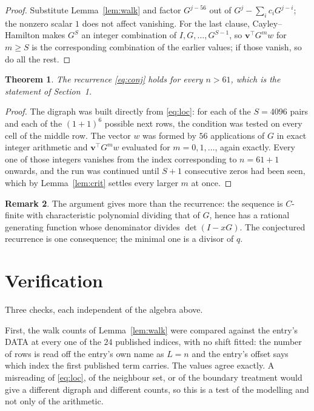 \documentclass[11pt,a4paper]{article}
\theoremstyle{plain}
\newtheorem{theorem}{Theorem}
\theoremstyle{definition}
\newtheorem{remark}[theorem]{Remark}
\begin{document}
\begin{proof}
Substitute Lemma~\ref{lem:walk} and factor $G^{j-56}$ out of
$G^{j}-\sum_ic_iG^{j-i}$; the nonzero scalar $1$ does not affect
vanishing. For the last clause, Cayley--Hamilton makes $G^{S}$ an integer combination of
$I,G,\dots,G^{S-1}$, so $\mathbf{v}^{\!\top}G^{m}w$ for $m\ge S$ is the corresponding
combination of the earlier values; if those vanish, so do all the rest.
\end{proof}

\begin{theorem}
The recurrence \eqref{eq:conj} holds for every $n>61$, which is the statement of
Section~1.
\end{theorem}

\begin{proof}
The digraph was built directly from \eqref{eq:loc}: for each of the $S=4096$ pairs and each
of the $(1+1)^{6}$ possible next rows, the condition was tested on every cell of
the middle row. The vector $w$ was formed by $56$ applications of $G$ in exact integer
arithmetic and $\mathbf{v}^{\!\top}G^{m}w$ evaluated for $m=0,1,\dots$, again exactly.
Every one of those integers vanishes from the index corresponding to $n=61+1$ onwards,
and the run was continued until $S+1$ consecutive zeros had been seen, which by
Lemma~\ref{lem:crit} settles every larger $m$ at once.
\end{proof}

\begin{remark}
The argument gives more than the recurrence: the sequence is $C$-finite with characteristic
polynomial dividing that of $G$, hence has a rational generating function whose denominator
divides $\det(I-xG)$. The conjectured recurrence is one consequence; the minimal one is a
divisor of $q$.
\end{remark}

\section{Verification}

Three checks, each independent of the algebra above.

First, the walk counts of Lemma~\ref{lem:walk} were compared against the entry's DATA at
every one of the $24$ published indices, with no shift fitted: the number of rows is
read off the entry's own name as $L=n$ and the entry's offset says which index the first
published term carries. The values agree exactly. A misreading of \eqref{eq:loc}, of the
neighbour set, or of the boundary treatment would give a different digraph and different
counts, so this is a test of the modelling and not only of the arithmetic.
\end{document}
